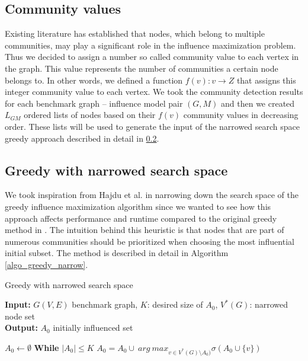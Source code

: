\documentclass[pdflatex,sn-mathphys-num]{sn-jnl}
\begin{document}

\subsection{Community values}\label{subsec_commval}

Existing literature \cite{cim} has established that nodes, which belong to multiple communities, may play a significant role in the influence maximization problem. Thus we decided to assign a number so called community value to each vertex in the graph. This value represents the number of communities a certain node belongs to. In other words, we defined a function $f(v): v \rightarrow Z$ that assigns this integer community value to each vertex. We took the community detection results for each benchmark graph -- influence model pair $(G,M)$ and then we created $L_{GM}$ ordered lists of nodes based on their $f(v)$ community values in decreasing order. These lists will be used to generate the input of the narrowed search space greedy approach described in detail in \ref{subsec_narrowed}.


\subsection{Greedy with narrowed search space}\label{subsec_narrowed}

We took inspiration from Hajdu et al. \cite{evaluating} in narrowing down the search space of the greedy influence maximization algorithm since we wanted to see how this approach affects performance and runtime compared to the original greedy method in \cite{kempe}. The intuition behind this heuristic is that nodes that are part of numerous communities should be prioritized when choosing the most influential initial subset. The method is described in detail in Algorithm \ref{algo_greedy_narrow}.

\begin{algorithm}[ht]
\caption{Greedy with narrowed search space}
\label{algo_greedy_narrow}
\textbf{Input:} $G(V,E)$ benchmark graph, $K$: desired size of $A_0$, $V^*(G)$: narrowed node set
\\
\textbf{Output:} $A_{0}$ initially influenced set
\begin{algorithmic}[1]
    \State $A_0 \leftarrow \emptyset$
    \State \textbf{While} $|A_{0}| \leq K$
    \State \hspace{\algorithmicindent} $A_{0}=A_{0} \cup \ arg \ max_{v \in V^*(G) \setminus A_{0})} \sigma(A_{0} \cup \{v\})$
\end{algorithmic}
\end{algorithm}
\end{document}
